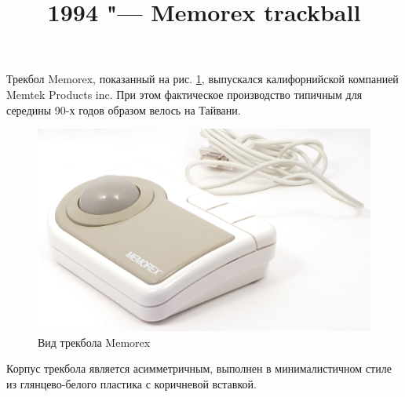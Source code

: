 \documentclass[11pt, a4paper]{article}
\begin{document}
\title{1994 "--- Memorex trackball}
\date{}
\maketitle

Трекбол Memorex, показанный на рис. \ref{fig:MemorexPic}, выпускался калифорнийской компанией Memtek Products inc. При этом фактическое производство типичным для середины 90-х годов образом велось на Тайвани.

\begin{figure}[h]
    \centering
    \includegraphics[scale=0.5]{1994_memorex_trackball/pic_30.jpg}
    \caption{Вид трекбола Memorex}
    \label{fig:MemorexPic}
\end{figure}

Корпус трекбола является асимметричным, выполнен в минималистичном стиле из глянцево-белого пластика с коричневой вставкой.
\end{document}
